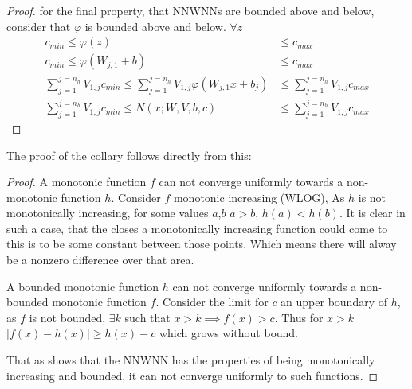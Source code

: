 \documentclass{article} %
\begin{document}
\begin{proof}
	for the final property, that NNWNNs are bounded above and below,
	consider that $\varphi$ is bounded above and below.
	$\forall z$
	\begin{align}
	c_{min} \le \varphi(z) &\le c_{max} \\
	c_{min} \le \varphi(W_{j,1}+b) &\le c_{max} \\
	\sum_{j=1}^{j=n_h}V_{1,j} c_{min} 
	\le \sum_{j=1}^{j=n_h}V_{1,j}\varphi(W_{j,1}x+b_j)
    &\le \sum_{j=1}^{j=n_h}V_{1,j}c_{max} \\
    \sum_{j=1}^{j=n_h}V_{1,j} c_{min} 
    \le N(x;W,V,b,c)
    &\le \sum_{j=1}^{j=n_h}V_{1,j}c_{max}
	\end{align}	
\end{proof}

The proof of the collary  follows directly from this:
\begin{proof}
	A monotonic function $f$ can not converge uniformly towards a non-monotonic function $h$.
	Consider $f$ monotonic increasing (WLOG),
	As $h$ is not monotonically increasing, for some values $a$,$b$ $a>b$, 
	$h(a)<h(b)$.
	It is clear in such a case, that the closes a monotonically increasing function could come to this is to be some constant between those points.
	Which means there will alway be a nonzero difference over that area.

		
	
	A bounded monotonic function $h$ can not converge uniformly towards a non-bounded monotonic function $f$.
	Consider the limit for $c$ an upper boundary of $h$,
	as $f$ is not bounded, $\exists k$ such that $x>k \implies f(x)>c$.
	Thus for $x>k$ $|f(x)-h(x)|\ge h(x)-c$ which grows without bound.
	
	That as  shows that the NNWNN has the properties of being monotonically increasing and bounded, it can not converge uniformly to such functions.
\end{proof}
\end{document}
